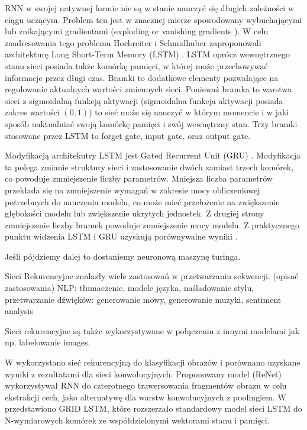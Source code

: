 \documentclass[oneside, mag]{mgr}
\begin{document}
RNN w swojej natywnej formie nie są w stanie nauczyć się długich zależności w ciągu uczącym. Problem ten jest w znacznej mierze spowodowany wybuchającymi lub znikającymi gradientami (exploding or vanishing gradients \cite{vanishing_gradient_RNN}). W celu zaadresowania tego problemu Hochreiter i Schmidhuber zaproponowali architekturę Long Short-Term Memory (LSTM) \cite{LSTM}. LSTM oprócz wewnętrznego stanu sieci posiada także komórkę pamięci, w której może przechowywać informacje przez długi czas. Bramki to dodatkowe elementy pozwalające na regulowanie aktualnych wartości zmiennych sieci. Ponieważ bramka to warstwa sieci z sigmoidalną funkcją aktywacji (sigmoidalna funkcja aktywacji posiada zakres wartości $(0,1)$) to sieć może się nauczyć w którym momencie i w jaki sposób uaktualniać swoją komórkę pamięci i swój wewnętrzny stan. Trzy bramki stosowane przez LSTM to forget gate, input gate, oraz output gate.  

Modyfikacją architekutry LSTM jest Gated Recurrent Unit (GRU) \cite{DBLP:journals/corr/ChungGCB15}. Modyfikacja ta polega zmianie struktury sieci i zastosowanie dwóch zamiast trzech komórek, co powoduje zmniejszenie liczby parametrów. Mniejsza liczba parametrów przekłada się na zmniejszenie wymagań w zakresie mocy obliczeniowej potrzebnych do nauczenia modelu, co może mieć przełożenie na zwiększenie głębokości modelu lub zwiększenie ukrytych jednostek. Z drugiej strony zmniejszenie liczby bramek powoduje zmniejszenie mocy modelu. Z praktycznego punktu widzenia LSTM i GRU uzyskują porównywalne wyniki \cite{DBLP:journals/corr/ChungGCB14}.

Jeśli pójdziemy dalej to dostaniemy neuronową maszynę turinga.

Sieci Rekurencyjne znalazły wiele zastosowań w przetwarzaniu sekwencji. (opisać zastosowania) NLP: tłumaczenie, modele języka, naśladowanie stylu, przetwarzanie dźwięków: generowanie mowy, generowanie muzyki, sentiment analysis 

Sieci rekurencyjne są także wykorzystywane w połączeniu z innymi modelami jak np. labelowanie images.

W \cite{DBLP:journals/corr/VisinKCMCB15} wykorzystano sieć rekurencyjną do klasyfikacji obrazów i porównano uzyskane wyniki z rezultatami dla sieci konwolucyjnych. Proponowany model (ReNet) wykorzystywał RNN do czterotnego trawersowania fragmentów obrazu w celu ekstrakcji cech, jako alternatywę dla warstw konwolucyjnych z poolingiem. W \cite{DBLP:journals/corr/KalchbrennerDG15} przedstawiono GRID LSTM, które rozszerzało standardowy model sieci LSTM do N-wymiarowych komórek ze współdzielonymi wektorami stanu i pamięci.
\end{document}

